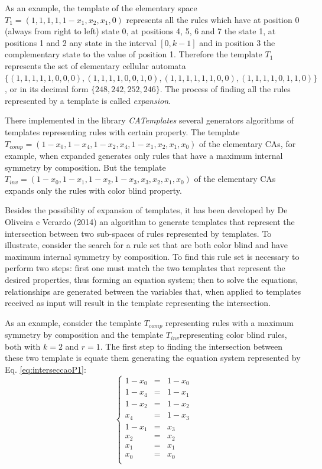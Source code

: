 \documentclass{llncs}
\begin{document}
As an example, the template of the elementary space $T_1 = (1,1,1,1,1-x_1,x_2,x_1,0)$ represents all the rules which have at position 0 (always from right to left) state 0, at positions 4, 5, 6 and 7 the state 1, at positions 1 and 2 any state in the interval $ [0, k-1] $ and in position 3 the complementary state to the value of position 1. Therefore the template $T_1$ represents the set of elementary cellular automata $\{(1,1,1,1,1,0,0,0),(1,1,1,1,0,0,1,0),(1,1,1,1,1,1,0,0),(1,1,1,1,0,1,1,0)\}$, or in its decimal form $\{248,242,252,246\}$. The process of finding all the rules represented by a template is called \textit{expansion}.

There implemented in the library \textit{CATemplates} \cite{CATemplates} several generators algorithms of templates representing rules with certain property. The template $T_{comp} = (1 - x_0, 1 - x_4, 1 - x_2, x_4, 1 - x_1, x_2, x_1, x_0)$ of the elementary CAs, for example, when expanded generates only rules that have a maximum internal symmetry by composition. But the template $T_{inv} = (1 - x_0, 1 - x_1, 1 - x_2, 1 - x_3, x_3, x_2, x_1, x_0)$ of the elementary CAs expands only the rules with color blind property.

Besides the possibility of expansion of templates, it has been developed by De Oliveira e Verardo (2014) an algorithm to generate templates that represent the intersection between two sub-spaces of rules represented by templates. To illustrate, consider the search for a rule set that are both color blind and have maximum internal symmetry by composition. To find this rule set is necessary to perform two steps: first one must match the two templates that represent the desired properties, thus forming an equation system; then to solve the equations, relationships are generated between the variables that, when applied to templates received as input will result in the template representing the intersection.

As an example, consider the template $T_{comp}$ representing rules with a maximum symmetry by composition and the template $T_{inv}$representing color blind rules, both with $k=2$ and $r=1$. The first step to finding the intersection between these two template is equate them generating the equation system represented by Eq. \ref{eq:interseccaoP1}:
\begin{equation}
\left\{\begin{matrix}
1 - x_0 & = & 1 - x_0 \\
1 - x_4 & = & 1 - x_1 \\
1 - x_2 & = & 1 - x_2 \\
x_4   & = & 1 - x_3 \\
1 - x_1 & = & x_3   \\
x_2   & = & x_2   \\
x_1   & = & x_1   \\
x_0   & = & x_0   \\
\end{matrix}\right.
\label{eq:interseccaoP1}
\end{equation}
\end{document}
